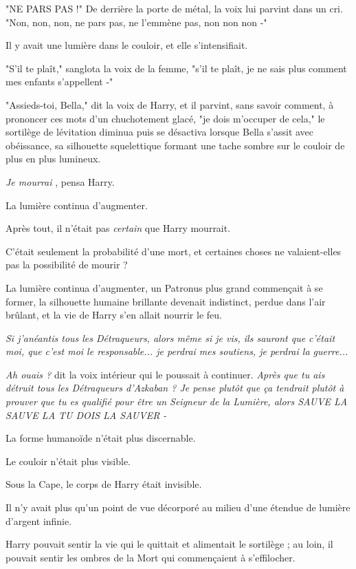 "NE PARS PAS !" De derrière la porte de métal, la voix lui parvint dans un cri. "Non, non, non, ne pars pas, ne l'emmène pas, non non non -"

Il y avait une lumière dans le couloir, et elle s'intensifiait.

"S'il te plaît," sanglota la voix de la femme, "s'il te plaît, je ne sais plus comment mes enfants s'appellent -"

"Assieds-toi, Bella," dit la voix de Harry, et il parvint, sans savoir comment, à prononcer ces mots d'un chuchotement glacé, "je dois m'occuper de cela," le sortilège de lévitation diminua puis se désactiva lorsque Bella s'assit avec obéissance, sa silhouette squelettique formant une tache sombre sur le couloir de plus en plus lumineux.

\emph{Je mourrai} , pensa Harry.

La lumière continua d'augmenter.

Après tout, il n'était pas \emph{certain}  que Harry mourrait.

C'était seulement la probabilité d'une mort, et certaines choses ne valaient-elles pas la possibilité de mourir ?

La lumière continua d'augmenter, un Patronus plus grand commençait à se former, la silhouette humaine brillante devenait indistinct, perdue dans l'air brûlant, et la vie de Harry s'en allait nourrir le feu.

\emph{Si j'anéantis tous les Détraqueurs, alors même si je vis, ils sauront que c'était moi, que c'est moi le responsable... je perdrai mes soutiens, je perdrai la guerre...} 

\emph{Ah ouais ?}  dit la voix intérieur qui le poussait à continuer. \emph{Après que tu ais détruit tous les Détraqueurs d'Azkaban ? Je pense plutôt que ça tendrait plutôt à prouver que tu es qualifié pour être un Seigneur de la Lumière, alors SAUVE LA SAUVE LA TU DOIS LA SAUVER -} 

La forme humanoïde n'était plus discernable.

Le couloir n'était plus visible.

Sous la Cape, le corps de Harry était invisible.

Il n'y avait plus qu'un point de vue décorporé au milieu d'une étendue de lumière d'argent infinie.

Harry pouvait sentir la vie qui le quittait et alimentait le sortilège ; au loin, il pouvait sentir les ombres de la Mort qui commençaient à s'effilocher.

